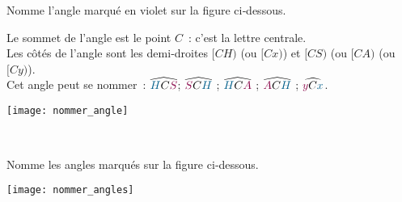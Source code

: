 \begin{methode*1}

\begin{exemple*1}
Nomme l'angle marqué en violet sur la figure ci‑dessous.  \\[0.75em]

\begin{minipage}[c]{0.70\textwidth}
Le sommet de l'angle est le point $C$ : c'est la lettre centrale. \\[0.5em]
Les côtés de l'angle sont les demi‑droites $[CH)$ (ou $[Cx)$) et $[CS)$ (ou $[CA)$ (ou $[Cy)$). \\[0.5em]
Cet angle peut se nommer : $\widehat{{\textcolor{A1}{H}}C{\textcolor{C1}{S}}}$; $\widehat{{\textcolor{C1}{S}}C{\textcolor{A1}{H}}}$ ; $\widehat{{\textcolor{A1}{H}}C{\textcolor{C1}{A}}}$ ; $\widehat{{\textcolor{C1}{A}}C{\textcolor{A1}{H}}}$ ; $\widehat{{\textcolor{C1}{y}}C{\textcolor{A1}{x}}}$.
 \end{minipage} \hfill%
 \begin{minipage}[c]{0.26\textwidth}
 \texttt{[image: nommer\_angle]}
 \end{minipage} \\
 
\end{exemple*1}

\exercice 
Nomme les angles marqués sur la figure ci‑dessous. 
\begin{center} \texttt{[image: nommer\_angles]} \end{center}

 
\end{methode*1}


